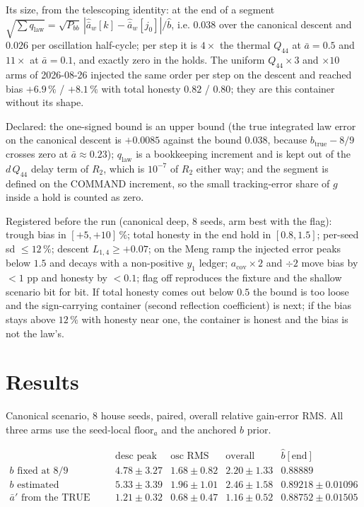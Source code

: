 \documentclass[11pt,a4paper,fontset=none]{ctexart}
\newcommand{\ba}{\bar{a}}
\begin{document}
Its size, from the telescoping identity: at the end of a segment
$\sqrt{\sum q_{\mathrm{law}}} = \sqrt{P_{bb}}\,|\hat{\ba}_w[k] -
\hat{\ba}_w[j_0]|/\hat{b}$, i.e. $0.038$ over the canonical descent and $0.026$
per oscillation half-cycle; per step it is $4\times$ the thermal $Q_{44}$ at
$\ba = 0.5$ and $11\times$ at $\ba = 0.1$, and exactly zero in the holds. The
uniform $Q_{44} \times 3$ and $\times 10$ arms of 2026-08-26 injected the same
order per step on the descent and reached bias $+6.9\,\%$ / $+8.1\,\%$ with
total honesty $0.82$ / $0.80$; they are this container without its shape.

Declared: the one-signed bound is an upper bound (the true integrated law error
on the canonical descent is $+0.0085$ against the bound $0.038$, because
$b_{\mathrm{true}} - 8/9$ crosses zero at $\ba \approx 0.23$); $q_{\mathrm{law}}$
is a bookkeeping increment and is kept out of the $d\,Q_{44}$ delay term of
$R_2$, which is $10^{-7}$ of $R_2$ either way; and the segment is defined on the
COMMAND increment, so the small tracking-error share of $g$ inside a hold is
counted as zero.

Registered before the run (canonical deep, 8 seeds, arm best with the flag):
trough bias in $[+5, +10]\,\%$; total honesty in the end hold in $[0.8, 1.5]$;
per-seed sd $\le 12\,\%$; descent $L_{1,4} \ge +0.07$; on the Meng ramp the
injected error peaks below $1.5$ and decays with a non-positive $y_1$ ledger;
$a_{\mathrm{cov}} \times 2$ and $\div 2$ move bias by $< 1$ pp and honesty by
$< 0.1$; flag off reproduces the fixture and the shallow scenario bit for bit.
If total honesty comes out below $0.5$ the bound is too loose and the
sign-carrying container (second reflection coefficient) is next; if the bias
stays above $12\,\%$ with honesty near one, the container is honest and the
bias is not the law's.

\section*{Results}

Canonical scenario, 8 house seeds, paired, overall relative gain-error RMS. All
three arms use the seed-local $\mathrm{floor}_a$ and the anchored $b$ prior.

\begin{equation*}
\begin{array}{lcccc}
 & \text{desc peak} & \text{osc RMS} & \text{overall} & \hat{b}[\mathrm{end}] \\[0.2em]
b \text{ fixed at } 8/9 & 4.78\pm3.27 & 1.68\pm0.82 & 2.20\pm1.33 & 0.88889 \\
b \text{ estimated}     & 5.33\pm3.39 & 1.96\pm1.01 & 2.46\pm1.58 & 0.89218\pm0.01096 \\
\ba' \text{ from the TRUE height} & 1.21\pm0.32 & 0.68\pm0.47 & 1.16\pm0.52 & 0.88752\pm0.01505
\end{array}
\end{equation*}
\end{document}
